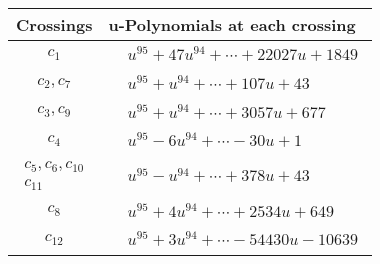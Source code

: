 \documentclass[1p]{elsarticle_modified}
\theoremstyle{definition}
\begin{document}
\begin{tabular}{m{50pt}|m{274pt}}
Crossings & \hspace{64pt}u-Polynomials at each crossing \\
\hline $$\begin{aligned}c_{1}\end{aligned}$$&$\begin{aligned}
&u^{95}+47 u^{94}+\cdots+22027 u+1849
\end{aligned}$\\
\hline $$\begin{aligned}c_{2},c_{7}\end{aligned}$$&$\begin{aligned}
&u^{95}+u^{94}+\cdots+107 u+43
\end{aligned}$\\
\hline $$\begin{aligned}c_{3},c_{9}\end{aligned}$$&$\begin{aligned}
&u^{95}+u^{94}+\cdots+3057 u+677
\end{aligned}$\\
\hline $$\begin{aligned}c_{4}\end{aligned}$$&$\begin{aligned}
&u^{95}-6 u^{94}+\cdots-30 u+1
\end{aligned}$\\
\hline $$\begin{aligned}c_{5},c_{6},c_{10}\\c_{11}\end{aligned}$$&$\begin{aligned}
&u^{95}- u^{94}+\cdots+378 u+43
\end{aligned}$\\
\hline $$\begin{aligned}c_{8}\end{aligned}$$&$\begin{aligned}
&u^{95}+4 u^{94}+\cdots+2534 u+649
\end{aligned}$\\
\hline $$\begin{aligned}c_{12}\end{aligned}$$&$\begin{aligned}
&u^{95}+3 u^{94}+\cdots-54430 u-10639
\end{aligned}$\\
\hline
\end{tabular}\\~\\
\end{document}

